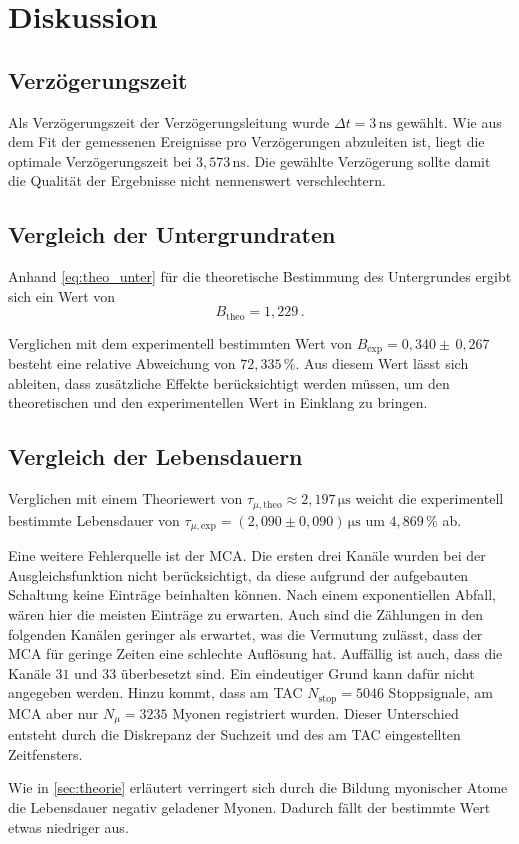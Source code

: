 \section{Diskussion}
\label{sec:Diskussion}

\subsection{Verzögerungszeit}

Als Verzögerungszeit der Verzögerungsleitung wurde $\Delta t = 3 \,\unit{\nano\second}$ gewählt.
Wie aus dem Fit der gemessenen Ereignisse pro Verzögerungen abzuleiten ist, liegt die optimale Verzögerungszeit bei
$3,573 \,\unit{\nano\second}$. Die gewählte Verzögerung sollte damit die Qualität der Ergebnisse nicht nennenswert verschlechtern.


\subsection{Vergleich der Untergrundraten}

Anhand \eqref{eq:theo_unter} für die theoretische Bestimmung des Untergrundes ergibt sich ein Wert von
\begin{equation}
    B_\text{theo} = 1,229 \,.
\end{equation}

Verglichen mit dem experimentell bestimmten Wert von $B_\text{exp} = 0,340 \pm \, 0,267$ besteht eine relative Abweichung von
$72,335 \,\%$. Aus diesem Wert lässt sich ableiten, dass zusätzliche Effekte berücksichtigt werden müssen, um den theoretischen und den experimentellen Wert in Einklang zu bringen.

\subsection{Vergleich der Lebensdauern}

Verglichen mit einem Theoriewert von $\tau_{\mu,\text{theo}} \approx 2,197 \,\unit{\micro\second}$ \cite{pdg} weicht die experimentell bestimmte Lebensdauer von
$\tau_{\mu,\text{exp}} =  \left(2,090  \pm 0,090 \right) \,\unit{\micro\second}$ um $4,869 \,\%$  ab.

Eine weitere Fehlerquelle ist der MCA. Die ersten drei Kanäle wurden bei der Ausgleichsfunktion nicht berücksichtigt, da diese aufgrund der aufgebauten Schaltung keine Einträge beinhalten können.
 Nach einem exponentiellen Abfall, wären hier die meisten Einträge zu erwarten. 
Auch sind die Zählungen in den folgenden Kanälen geringer als erwartet, was die Vermutung zulässt, dass der MCA für geringe Zeiten eine schlechte Auflösung hat.
Auffällig ist auch, dass die Kanäle $31$ und $33$ überbesetzt sind. Ein eindeutiger Grund kann dafür nicht angegeben werden.
Hinzu kommt, dass am TAC $N_\text{stop} = 5046$ Stoppsignale, am MCA aber nur $N_{\mu} = 3235$ Myonen registriert wurden.
Dieser Unterschied entsteht durch die Diskrepanz der Suchzeit und des am TAC eingestellten Zeitfensters.

Wie in \autoref{sec:theorie} erläutert verringert sich durch die Bildung myonischer Atome die Lebensdauer
negativ geladener Myonen. Dadurch fällt der bestimmte Wert etwas niedriger aus. \\


